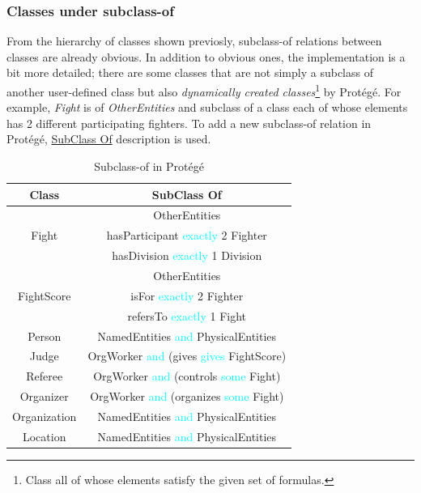 \documentclass[a4paper]{article}
\begin{document}
\subsubsection{Classes under subclass-of}
From the hierarchy of classes shown previosly, subclass-of relations between classes are already obvious. In addition to obvious ones, the implementation is a bit more detailed; there are some classes 
that are not simply a subclass of another user-defined class but also \textit{dynamically created classes}\footnote{Class all of whose elements satisfy the given set of formulas.} by Prot\'eg\'e. 
For example, \textit{Fight} is of \textit{OtherEntities} and subclass of a class each of whose elements has 2 different participating fighters. To add a new subclass-of relation in Prot\'eg\'e, 
\underline{SubClass Of} description is used.

\begin{table}[H]
	\centering
	\begin{tabular}{c|c}
		\hline
		\textbf{Class} & \textbf{SubClass Of} \\
		\hline
		 		& OtherEntities \\
		Fight	& hasParticipant \textcolor{cyan}{exactly} 2 Fighter \\
				& hasDivision \textcolor{cyan}{exactly} 1 Division \\
		\hline
					& OtherEntities \\
		FightScore	& isFor \textcolor{cyan}{exactly} 2 Fighter \\
					& refersTo \textcolor{cyan}{exactly} 1 Fight \\
		\hline
		Person & NamedEntities \textcolor{cyan}{and} PhysicalEntities \\
		\hline
		Judge & OrgWorker \textcolor{cyan}{and} (gives \textcolor{cyan}{gives} FightScore) \\
		\hline
		Referee & OrgWorker \textcolor{cyan}{and} (controls \textcolor{cyan}{some} Fight) \\
		\hline
		Organizer & OrgWorker \textcolor{cyan}{and} (organizes \textcolor{cyan}{some} Fight) \\
		\hline
		Organization & NamedEntities \textcolor{cyan}{and} PhysicalEntities \\
		\hline
		Location & NamedEntities \textcolor{cyan}{and} PhysicalEntities \\
	\end{tabular}
	\caption{Subclass-of in Prot\'eg\'e}
	\label{tab:protege_subclassof}
\end{table}
\end{document}
